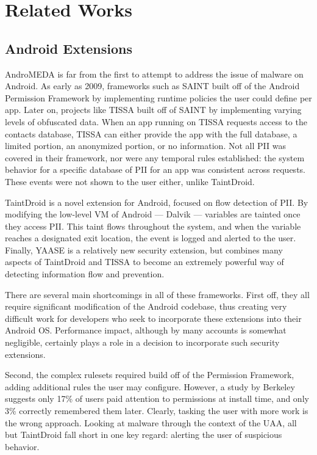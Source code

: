 \documentclass{acm_proc_article-sp}
\begin{document}
\section{Related Works}

\subsection{Android Extensions}
AndroMEDA is far from the first to attempt to address the issue of malware on Android. As early as 2009, frameworks such as SAINT\citep{ongtang2012semantically} built off of the Android Permission Framework by implementing runtime policies the user could define per app. Later on, projects like TISSA\citep{zhou2011taming} built off of SAINT by implementing varying levels of obfuscated data. When an app running on TISSA requests access to the contacts database, TISSA can either provide the app with the full database, a limited portion, an anonymized portion, or no information. Not all PII was covered in their framework, nor were any temporal rules established: the system behavior for a specific database of PII for an app was consistent across requests. These events were not shown to the user either, unlike TaintDroid\citep{enck2010taintdroid}.

TaintDroid is a novel extension for Android, focused on flow detection of PII. By modifying the low-level VM of Android --- Dalvik --- variables are tainted once they access PII. This taint flows throughout the system, and when the variable reaches a designated exit location, the event is logged and alerted to the user. Finally, YAASE\citep{russello2011yaase} is a relatively new security extension, but combines many aspects of TaintDroid and TISSA to become an extremely powerful way of detecting information flow and prevention.

There are several main shortcomings in all of these frameworks. First off, they all require significant modification of the Android codebase, thus creating very difficult work for developers who seek to incorporate these extensions into their Android OS. Performance impact, although by many accounts is somewhat negligible, certainly plays a role in a decision to incorporate such security extensions.

Second, the complex rulesets required build off of the Permission Framework, adding additional rules the user may configure. However, a study by Berkeley suggests only 17\% of users paid attention to permissions at install time, and only 3\% correctly remembered them later\citep{felt2012android}. Clearly, tasking the user with more work is the wrong approach. Looking at malware through the context of the UAA, all but TaintDroid fall short in one key regard: alerting the user of suspicious behavior.
\end{document}
